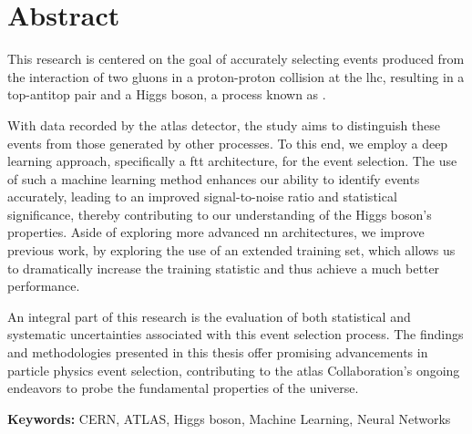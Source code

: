 \chapter*{Abstract}

This research is centered on the goal of accurately selecting events produced from the interaction of two gluons in a
proton-proton collision at the \acrshort{lhc}, resulting in a top-antitop pair and a Higgs boson, a process known as \tth.

With data recorded by the \acrshort{atlas} detector, the study aims to distinguish these \tth events
from those generated by other processes. To this end, we employ a deep learning approach, specifically a \acrshort{ftt}
architecture, for the event selection. The use of such a machine learning method enhances our ability to identify \tth
events accurately, leading to an improved signal-to-noise ratio and statistical significance, thereby contributing to
our understanding of the Higgs boson's properties. Aside of exploring more advanced \acrshort{nn} architectures, we
improve previous work, by exploring the use of an extended training set, which allows us to dramatically increase the
training statistic and thus achieve a much better performance.

An integral part of this research is the evaluation of both statistical and systematic uncertainties associated with
this event selection process. The findings and methodologies presented in this thesis offer promising advancements in
particle physics event selection, contributing to the \acrshort{atlas} Collaboration's ongoing endeavors to probe the
fundamental properties of the universe.

\vspace{3mm}
\noindent
\textbf{Keywords:}
CERN, ATLAS, Higgs boson, Machine Learning, Neural Networks